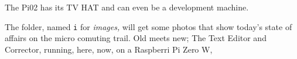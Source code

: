 
The Pi02 has its TV HAT and can even be a development machine. %

The folder, named {\tt i} for {\it images,} will get some photos that show today's
state of affairs on the micro comuting trail.  Old meets new; The Text Editor and
Corrector, running, here, now, on a Raspberri Pi Zero W, %

\bye

